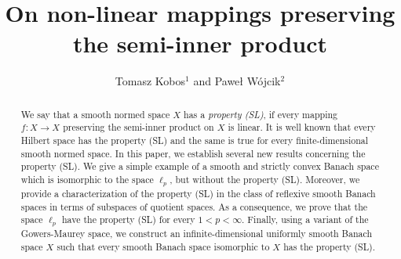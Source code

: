 \documentclass[12pt, reqno]{amsart}
\theoremstyle{definition}
\theoremstyle{remark}
\numberwithin{equation}{section}
\begin{document}
\setcounter{page}{1}

\title[On non-linear mappings preserving  the semi-inner product]
{On non-linear mappings preserving  the semi-inner product}
\author[T. Kobos \MakeLowercase{and} P. W\'ojcik]
{Tomasz Kobos$^1$ \MakeLowercase{and} Pawe\l{} W\'ojcik$^2$}
\address{$^1$Faculty of Mathematics and Computer Science, Jagiellonian University, \L ojasiewicza 6, 30-348 Krak\'ow, Poland}
\address{$^2$Institute of Mathematics, Pedagogical University of Cracow, Podchor\c a\.zych~2, 30-084 Krak\'ow, Poland}

\begin{abstract}
We say that a smooth normed space $X$ has a \textit{property (SL)}, if every mapping $f:X \to X$ preserving the semi-inner product on $X$ is linear. It is well known that every Hilbert space has the property (SL) and the same is true for every finite-dimensional smooth normed space. In this paper, we establish several new results concerning the property (SL). We give a simple example of a smooth and strictly convex Banach space which is isomorphic to the space $\ell_p$, but without the property (SL). Moreover, we provide a characterization of the property (SL) in the class of reflexive smooth Banach spaces in terms of subspaces of quotient spaces. As a consequence, we prove that the space $\ell_p$ have the property (SL) for every $1 < p < \infty$. Finally, using a variant of the Gowers-Maurey space, we construct an infinite-dimensional uniformly smooth Banach space $X$ such that every smooth Banach space isomorphic to $X$ has the property (SL).
\end{abstract} \maketitle
\end{document}
